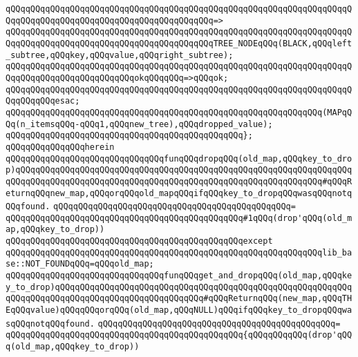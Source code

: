 \verb|qQQqqQQqqQQqqQQqqQQqqQQqqQQqqQQqqQQqqQQqqQQqqQQqqQQqqQQqqQQqqQQqqQQqqQQqqQQqqQQqqQQqqQQqqQQqqQQqqQQqqQQqqQQqqQQq=>|\newline
\verb|qQQqqQQqqQQqqQQqqQQqqQQqqQQqqQQqqQQqqQQqqQQqqQQqqQQqqQQqqQQqqQQqqQQqqQQqqQQqqQQqqQQqqQQqqQQqqQQqqQQqqQQqqQQqqQQqTREE_NODEqQQq(BLACK,qQQqleft_subtree,qQQqkey,qQQqvalue,qQQqright_subtree);|\newline
\newline
\verb|qQQqqQQqqQQqqQQqqQQqqQQqqQQqqQQqqQQqqQQqqQQqqQQqqQQqqQQqqQQqqQQqqQQqqQQqqQQqqQQqqQQqqQQqqQQqqQQqokqQQqqQQq=>qQQqok;|\newline
\verb|qQQqqQQqqQQqqQQqqQQqqQQqqQQqqQQqqQQqqQQqqQQqqQQqqQQqqQQqqQQqqQQqqQQqqQQqqQQqqQQqesac;|\newline
\newline
\verb|qQQqqQQqqQQqqQQqqQQqqQQqqQQqqQQqqQQqqQQqqQQqqQQqqQQqqQQqqQQqqQQq(MAPqQQq(n_itemsqQQq-qQQq1,qQQqnew_tree),qQQqdropped_value);|\newline
\verb|qQQqqQQqqQQqqQQqqQQqqQQqqQQqqQQqqQQqqQQqqQQqqQQq};|\newline
\verb|qQQqqQQqqQQqqQQqherein|\newline
\verb|qQQqqQQqqQQqqQQqqQQqqQQqqQQqqQQqfunqQQqdropqQQq(old_map,qQQqkey_to_drop)qQQqqQQqqQQqqQQqqQQqqQQqqQQqqQQqqQQqqQQqqQQqqQQqqQQqqQQqqQQqqQQqqQQqqQQqqQQqqQQqqQQqqQQqqQQqqQQqqQQqqQQqqQQqqQQqqQQqqQQqqQQqqQQqqQQq#qQQqReturnqQQqnew_map,qQQqorqQQqold_mapqQQqifqQQqkey_to_dropqQQqwasqQQqnotqQQqfound.|\newline
\verb|qQQqqQQqqQQqqQQqqQQqqQQqqQQqqQQqqQQqqQQqqQQqqQQq=|\newline
\verb|qQQqqQQqqQQqqQQqqQQqqQQqqQQqqQQqqQQqqQQqqQQqqQQq#1qQQq(drop'qQQq(old_map,qQQqkey_to_drop))|\newline
\verb|qQQqqQQqqQQqqQQqqQQqqQQqqQQqqQQqqQQqqQQqqQQqqQQqexcept|\newline
\verb|qQQqqQQqqQQqqQQqqQQqqQQqqQQqqQQqqQQqqQQqqQQqqQQqqQQqqQQqqQQqqQQqlib_base::NOT_FOUNDqQQq=qQQqold_map;|\newline
\newline
\verb|qQQqqQQqqQQqqQQqqQQqqQQqqQQqqQQqfunqQQqget_and_dropqQQq(old_map,qQQqkey_to_drop)qQQqqQQqqQQqqQQqqQQqqQQqqQQqqQQqqQQqqQQqqQQqqQQqqQQqqQQqqQQqqQQqqQQqqQQqqQQqqQQqqQQqqQQqqQQqqQQqqQQq#qQQqReturnqQQq(new_map,qQQqTHEqQQqvalue)qQQqqQQqorqQQq(old_map,qQQqNULL)qQQqifqQQqkey_to_dropqQQqwasqQQqnotqQQqfound.|\newline
\verb|qQQqqQQqqQQqqQQqqQQqqQQqqQQqqQQqqQQqqQQqqQQqqQQq=|\newline
\verb|qQQqqQQqqQQqqQQqqQQqqQQqqQQqqQQqqQQqqQQqqQQqqQQq{qQQqqQQqqQQq(drop'qQQq(old_map,qQQqkey_to_drop))|\newline
